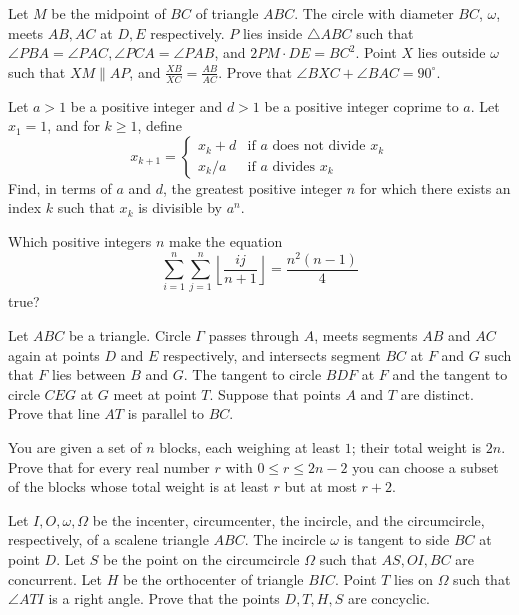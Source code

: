 \documentclass[11pt]{scrartcl}
\begin{document}
\begin{problem}[591652153716935]
	Let $M$ be the midpoint of $BC$ of triangle $ABC$. The circle with diameter $BC$, $\omega$, meets $AB,AC$ at $D,E$ respectively. $P$ lies inside $\triangle ABC$ such that $\angle PBA=\angle PAC, \angle PCA=\angle PAB$, and $2PM\cdot DE=BC^2$. Point $X$ lies outside $\omega$ such that $XM\parallel AP$, and $\frac{XB}{XC}=\frac{AB}{AC}$. Prove that $\angle BXC +\angle BAC=90^{\circ}$.
\end{problem}
\begin{problem}[3159161448000677570]
Let $a > 1$ be a positive integer and $d > 1$ be a positive integer coprime to $a$. Let $x_1=1$, and for $k\geq 1$, define
$$x_{k+1} = \begin{cases}
x_k + d &\text{if } a \text{ does not divide } x_k \\
x_k/a & \text{if } a \text{ divides } x_k
\end{cases}$$Find, in terms of $a$ and $d$, the greatest positive integer $n$ for which there exists an index $k$ such that $x_k$ is divisible by $a^n$.
\end{problem}
\begin{problem}[819328919046836]
Which positive integers $n$ make the equation\[\sum_{i=1}^n \sum_{j=1}^n \left\lfloor \frac{ij}{n+1} \right\rfloor=\frac{n^2(n-1)}{4}\]true?
\end{problem}
\begin{problem}[797215984506934]
	Let $ABC$ be a triangle. Circle $\Gamma$ passes through $A$, meets segments $AB$ and $AC$ again at points $D$ and $E$ respectively, and intersects segment $BC$ at $F$ and $G$ such that $F$ lies between $B$ and $G$. The tangent to circle $BDF$ at $F$ and the tangent to circle $CEG$ at $G$ meet at point $T$. Suppose that points $A$ and $T$ are distinct. Prove that line $AT$ is parallel to $BC$.
\end{problem}
\begin{problem}[37921131297270]
	You are given a set of $n$ blocks, each weighing at least $1$; their total weight is $2n$. Prove that for every real number $r$ with $0 \leq r \leq 2n-2$ you can choose a subset of the blocks whose total weight is at least $r$ but at most $r + 2$.
\end{problem}
\begin{problem}[1168447466971762345]
	Let $I, O, \omega, \Omega$ be the incenter, circumcenter, the incircle, and the circumcircle, respectively, of a scalene triangle $ABC$. The incircle $\omega$ is tangent to side $BC$ at point $D$. Let $S$ be the point on the circumcircle $\Omega$ such that $AS, OI, BC$ are concurrent. Let $H$ be the orthocenter of triangle $BIC$. Point $T$ lies on $\Omega$ such that $\angle ATI$ is a right angle. Prove that the points $D, T, H, S$ are concyclic.
\end{problem}
\end{document}
